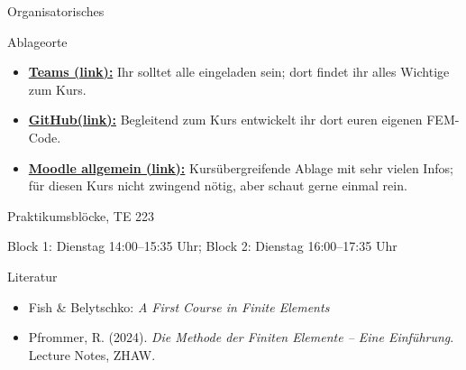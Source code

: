 \documentclass[aspectratio=169,professionalfonts]{beamer}
\begin{document}
\begin{frame}{Organisatorisches}
  \small
  \begin{block}{Ablageorte}
    \begin{itemize}
      \item \href{https://teams.microsoft.com/l/team/19\%3AGIHu109EeqabU7ycNk9ORnolyco2HQO7hqafNFYbHHo1\%40thread.tacv2/conversations?groupId=2e4b8463-38a0-41e3-ba6f-93b417edfb12&tenantId=5d1a9f9d-201f-4a10-b983-451cf65cbc1e}{\textbf{Teams (link):}} Ihr solltet alle eingeladen sein; dort findet ihr alles Wichtige zum Kurs.
            \item \href{https://github.com/Boscij/FEM}{\textbf{GitHub(link):}} Begleitend zum Kurs entwickelt ihr dort euren eigenen FEM-Code.
      \item \href{https://moodle.zhaw.ch/course/view.php?id=1979}{\textbf{Moodle allgemein (link):}} Kursübergreifende Ablage mit sehr vielen Infos; für diesen Kurs nicht zwingend nötig, aber schaut gerne einmal rein.

    \end{itemize}
  \end{block}

  \vspace{0.1em}
  \begin{block}{Praktikumsblöcke, TE 223}

Block 1: Dienstag 14:00--15:35 Uhr; Block 2: Dienstag 16:00--17:35 Uhr

  \end{block}
  
  \vspace{0.1em}
  \begin{block}{Literatur}
    \footnotesize
    \begin{itemize}
      \item Fish \& Belytschko: \emph{A First Course in Finite Elements}
      \item Pfrommer, R. (2024). \emph{Die Methode der Finiten Elemente -- Eine Einf\"uhrung}. Lecture Notes, ZHAW.
    \end{itemize}
  \end{block}
\end{frame}
\end{document}
